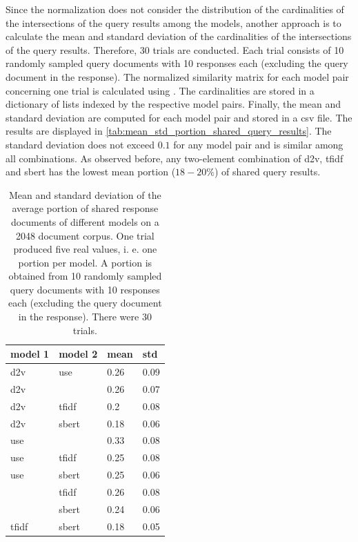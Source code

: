 Since the normalization does not consider the distribution of the cardinalities of the intersections of the query results among the models,
another approach is to calculate the mean and standard deviation of the cardinalities of the intersections of the query results.
Therefore, 30 trials are conducted.
Each trial consists of 10 randomly sampled query documents with 10 responses each (excluding the query document in the response).
The normalized similarity matrix for each model pair concerning one trial is calculated using .
The cardinalities are stored in a dictionary of lists indexed by the respective model pairs.
Finally, the mean and standard deviation are computed for each model pair and stored in a \ac{csv} file.
The results are displayed in \autoref{tab:mean_std_portion_shared_query_results}.
The standard deviation does not exceed $0.1$ for any model pair and is similar among all combinations.
As observed before, any two-element combination of \ac{d2v}, \ac{tfidf} and \ac{sbert} has the lowest mean portion ($18-20\%$) of shared query results.

\begin{table}[]
    \centering
    \caption{Mean and standard deviation of the average portion of shared response documents of different models on a 2048 document corpus.
    One trial produced five real values, i. e. one portion per model.
    A portion is obtained from 10 randomly sampled query documents with 10 responses each (excluding the query document in the response).
    There were 30 trials.
    }
    \begin{tabular}{|l|l|l|l|}
    \hline
    \rowcolor[HTML]{C0C0C0} 
    \textbf{model 1} & \textbf{model 2} & \textbf{mean} & \textbf{std} \\ \hline
    \ac{d2v}          & \ac{use}        & 0.26          & 0.09         \\ \hline
    \ac{d2v}          & \infersent{}            & 0.26          & 0.07         \\ \hline
    \ac{d2v}          & \ac{tfidf}            & 0.2           & 0.08         \\ \hline
    \ac{d2v}          & \ac{sbert}          & 0.18          & 0.06         \\ \hline
    \ac{use}        & \infersent{}            & 0.33          & 0.08         \\ \hline
    \ac{use}        & \ac{tfidf}            & 0.25          & 0.08         \\ \hline
    \ac{use}        & \ac{sbert}          & 0.25          & 0.06         \\ \hline
    \infersent{}            & \ac{tfidf}            & 0.26          & 0.08         \\ \hline
    \infersent{}            & \ac{sbert}          & 0.24          & 0.06         \\ \hline
    \ac{tfidf}            & \ac{sbert}          & 0.18          & 0.05         \\ \hline
    \end{tabular}
    \label{tab:mean_std_portion_shared_query_results}
\end{table}



